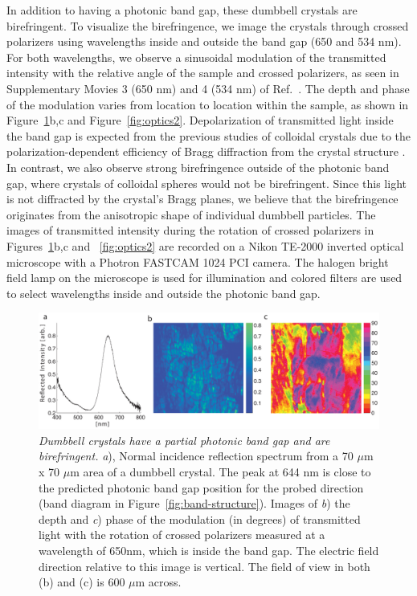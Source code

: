 In addition to having a photonic band gap, these dumbbell crystals are birefringent.
To visualize the birefringence, we image the crystals through crossed polarizers using wavelengths inside and outside the band gap (650 and 534 nm).
For both wavelengths, we observe a sinusoidal modulation of the transmitted intensity with the relative angle of the sample and crossed polarizers, as seen in Supplementary Movies 3 (650 nm) and 4 (534 nm) of Ref.~\cite{Forster:2011}.
The depth and phase of the modulation varies from location to location within the sample, as shown in Figure~\ref{fig:optics}b,c and Figure~\ref{fig:optics2}.
Depolarization of transmitted light inside the band gap is expected from the previous studies of colloidal crystals due to the polarization-dependent efficiency of Bragg diffraction from the crystal structure \cite{Monovoukas1990}.
In contrast, we also observe strong birefringence outside of the photonic band gap, where crystals of colloidal spheres would not be birefringent.
Since this light is not diffracted by the crystal's Bragg planes, we believe that the birefringence originates from the anisotropic shape of individual dumbbell particles.
The images of transmitted intensity during the rotation of crossed polarizers in Figures~\ref{fig:optics}b,c and ~\ref{fig:optics2} are recorded on a Nikon TE-2000 inverted optical microscope with a Photron FASTCAM 1024 PCI camera. 
The halogen bright field lamp on the microscope is used for illumination and colored filters are used to select wavelengths inside and outside the photonic band gap.
 
\begin{figure}[htbp]
\centering
\includegraphics[width=1.0\textwidth]{figures/CFigure5.pdf}
\caption{\label{fig:optics} \emph{Dumbbell crystals have a partial photonic band gap and are birefringent.}
	\emph{a}), Normal incidence reflection spectrum from a 70 $\mu$m x 70 $\mu$m area of a dumbbell crystal. The peak at 644 nm is close to the predicted photonic band gap position for the probed direction (band diagram in Figure~\ref{fig:band-structure}). 
	Images of \emph{b}) the depth and \emph{c}) phase of the modulation (in degrees) of transmitted light with the rotation of crossed polarizers measured at a wavelength of 650nm, which is inside the band gap. The electric field direction relative to this image is vertical. The field of view in both (b) and (c) is 600 $\mu$m across.}
\end{figure} 
 
